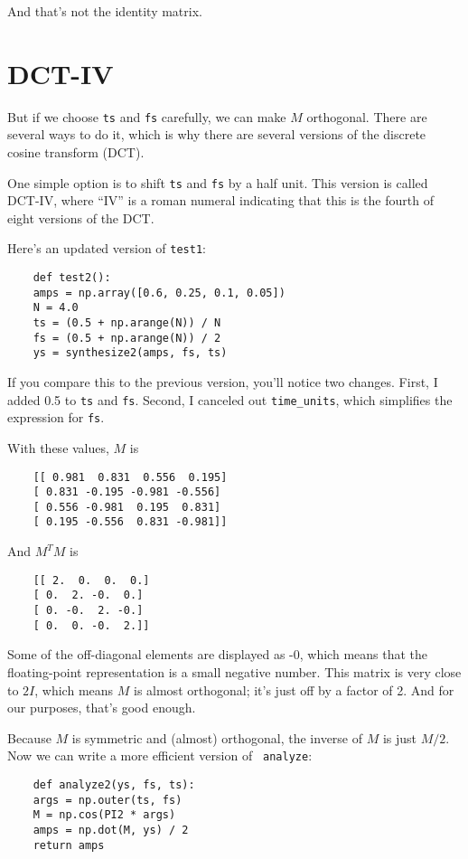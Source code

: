 And that's not the identity matrix.


\section{DCT-IV}
\label{dctiv}

But if we choose {\tt ts} and {\tt fs} carefully,
we can make $M$ orthogonal.  There are several ways to do it, which
is why there are several versions of the discrete cosine transform (DCT).

One simple option is to shift {\tt ts} and {\tt fs} by a half unit.
This version is called DCT-IV, where ``IV'' is a roman numeral
indicating that this is the fourth of eight versions of the DCT.

Here's an updated version of {\tt test1}:

\begin{verbatim}
	def test2():
	amps = np.array([0.6, 0.25, 0.1, 0.05])
	N = 4.0
	ts = (0.5 + np.arange(N)) / N
	fs = (0.5 + np.arange(N)) / 2
	ys = synthesize2(amps, fs, ts)
\end{verbatim}

If you compare this to the previous version, you'll notice
two changes.  First, I added 0.5 to {\tt ts} and {\tt fs}.
Second, I canceled out \verb"time_units", which simplifies
the expression for {\tt fs}.

With these values, $M$ is

\begin{verbatim}
	[[ 0.981  0.831  0.556  0.195]
	[ 0.831 -0.195 -0.981 -0.556]
	[ 0.556 -0.981  0.195  0.831]
	[ 0.195 -0.556  0.831 -0.981]]
\end{verbatim}

And $M^TM$ is

\begin{verbatim}
	[[ 2.  0.  0.  0.]
	[ 0.  2. -0.  0.]
	[ 0. -0.  2. -0.]
	[ 0.  0. -0.  2.]]
\end{verbatim}

Some of the off-diagonal elements are displayed as -0, which means
that the floating-point representation is a small negative number.
This matrix is very close to $2I$, which means $M$ is almost
orthogonal; it's just off by a factor of 2.  And for our purposes,
that's good enough.

Because $M$ is symmetric and (almost) orthogonal, the inverse of $M$
is just $M/2$.  Now we can write a more efficient version of {\tt
	analyze}:

\begin{verbatim}
	def analyze2(ys, fs, ts):
	args = np.outer(ts, fs)
	M = np.cos(PI2 * args)
	amps = np.dot(M, ys) / 2
	return amps
\end{verbatim}

